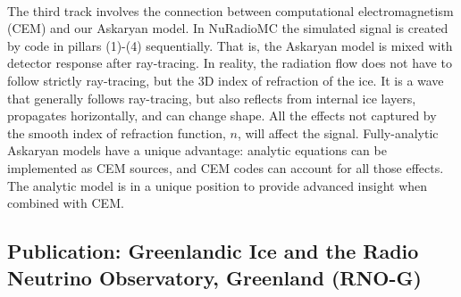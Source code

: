 \documentclass[../../../main.tex]{subfiles}
\begin{document}
\\
\vspace{0.25cm}
The third track involves the connection between computational electromagnetism (CEM) and our Askaryan model. In NuRadioMC the simulated signal is created by code in pillars (1)-(4) sequentially. That is, the Askaryan model is mixed with detector response after ray-tracing. In reality, the radiation flow does not have to follow strictly ray-tracing, but the 3D index of refraction of the ice. It is a wave that generally follows ray-tracing, but also reflects from internal ice layers, propagates horizontally, and can change shape. All the effects not captured by the smooth index of refraction function, $n$, will affect the signal.  Fully-analytic Askaryan models have a unique advantage: analytic equations can be implemented as CEM sources, and CEM codes can account for all those effects. The analytic model is in a unique position to provide advanced insight when combined with CEM.

\subsection{Publication: Greenlandic Ice and the Radio Neutrino Observatory, Greenland (RNO-G)}
\end{document}

